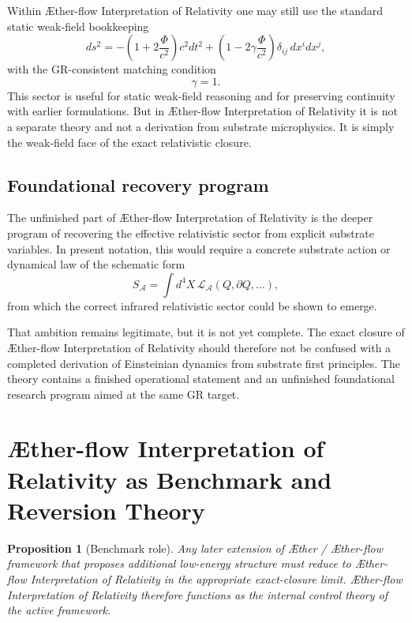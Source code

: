 \documentclass[11pt]{article}
\newcommand{\Aether}{\AE{}ther}
\newcommand{\Aflow}{\AE{}ther-flow}
\newcommand{\TheoryName}{\Aflow{} Interpretation of Relativity}
\newcommand{\TheoryProgram}{\Aether{} / \Aflow{} framework}
\newcommand{\Ph}{\Phi}
\newtheorem{proposition}{Proposition}
\begin{document}
Within \TheoryName{} one may still use the standard static weak-field bookkeeping
\begin{equation}
ds^2
=
-\left(1+2\frac{\Ph}{c^2}\right)c^2dt^2
+
\left(1-2\gamma\frac{\Ph}{c^2}\right)\delta_{ij}\,dx^i dx^j,
\label{eq:weakfield}
\end{equation}
with the GR-consistent matching condition
\begin{equation}
\gamma = 1.
\label{eq:gamma}
\end{equation}
This sector is useful for static weak-field reasoning and for preserving continuity with earlier formulations. But in \TheoryName{} it is not a separate theory and not a derivation from substrate microphysics. It is simply the weak-field face of the exact relativistic closure.

\subsection{Foundational recovery program}

The unfinished part of \TheoryName{} is the deeper program of recovering the effective relativistic sector from explicit substrate variables. In present notation, this would require a concrete substrate action or dynamical law of the schematic form
\begin{equation}
S_{\mathcal A}
=
\int d^4X\,\mathcal L_{\mathcal A}(Q,\partial Q,\ldots),
\label{eq:substrateaction}
\end{equation}
from which the correct infrared relativistic sector could be shown to emerge.

That ambition remains legitimate, but it is not yet complete. The exact closure of \TheoryName{} should therefore not be confused with a completed derivation of Einsteinian dynamics from substrate first principles. The theory contains a finished operational statement and an unfinished foundational research program aimed at the same GR target.

\section{\TheoryName{} as Benchmark and Reversion Theory}

\begin{proposition}[Benchmark role]
Any later extension of \TheoryProgram{} that proposes additional low-energy structure must reduce to \TheoryName{} in the appropriate exact-closure limit. \TheoryName{} therefore functions as the internal control theory of the active framework.
\end{proposition}
\end{document}
